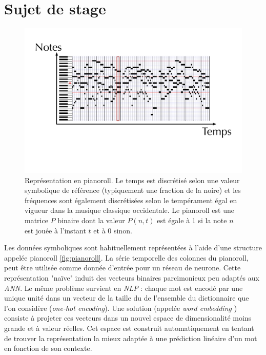 \documentclass[a4paper, 10pt]{article} %
\begin{document}
\section{Sujet de stage}
\begin{figure}
\begin{center}
\includegraphics[scale=0.3]{../pr.pdf}
\end{center}
\label{fig:pr}
\caption{Représentation en pianoroll. Le temps est discrétisé selon une valeur symbolique de référence (typiquement une fraction de la noire) et les fréquences sont également discrétisées selon le tempérament égal en vigueur dans la musique classique occidentale. Le pianoroll est une matrice $P$ binaire dont la valeur $P(n,t)$ est égale à 1 si la note $n$ est jouée à l'instant $t$ et à 0 sinon.}
\end{figure}

Les données symboliques sont habituellement représentées à l'aide d'une structure appelée pianoroll \ref{fig:pianoroll}. La série temporelle des colonnes du pianoroll, peut être utilisée comme donnée d'entrée pour un réseau de neurone. Cette représentation "naïve" induit des vecteurs binaires parcimonieux peu adaptés aux \textit{ANN}. Le même problème survient en \textit{NLP} : chaque mot est encodé par une unique unité dans un vecteur de la taille du de l'ensemble du dictionnaire que l'on considère (\textit{one-hot encoding}). Une solution (appelée \textit{word embedding} \cite{mikolov2013efficient}) consiste à projeter ces vecteurs dans un nouvel espace de dimensionalité moins grande et à valeur réelles. Cet espace est construit automatiquement en tentant de trouver la représentation la mieux adaptée à une prédiction linéaire d'un mot en fonction de son contexte.
\end{document}
